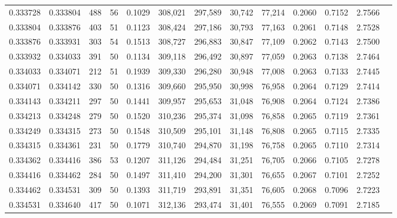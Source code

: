 \begin{tabular}{rrrrrrrrrrrrr}
0.333728 & 0.333804 &   488 &  56 &                                     0.1029 & 308,021 & 297,589 &  30,742 &  77,214 & 0.2060 & 0.7152 & 2.7566 \\
0.333804 & 0.333876 &   403 &  51 &                                     0.1123 & 308,424 & 297,186 &  30,793 &  77,163 & 0.2061 & 0.7148 & 2.7528 \\
0.333876 & 0.333931 &   303 &  54 &                                     0.1513 & 308,727 & 296,883 &  30,847 &  77,109 & 0.2062 & 0.7143 & 2.7500 \\
0.333932 & 0.334033 &   391 &  50 &                                     0.1134 & 309,118 & 296,492 &  30,897 &  77,059 & 0.2063 & 0.7138 & 2.7464 \\
0.334033 & 0.334071 &   212 &  51 &                                     0.1939 & 309,330 & 296,280 &  30,948 &  77,008 & 0.2063 & 0.7133 & 2.7445 \\
0.334071 & 0.334142 &   330 &  50 &                                     0.1316 & 309,660 & 295,950 &  30,998 &  76,958 & 0.2064 & 0.7129 & 2.7414 \\
0.334143 & 0.334211 &   297 &  50 &                                     0.1441 & 309,957 & 295,653 &  31,048 &  76,908 & 0.2064 & 0.7124 & 2.7386 \\
0.334213 & 0.334248 &   279 &  50 &                                     0.1520 & 310,236 & 295,374 &  31,098 &  76,858 & 0.2065 & 0.7119 & 2.7361 \\
0.334249 & 0.334315 &   273 &  50 &                                     0.1548 & 310,509 & 295,101 &  31,148 &  76,808 & 0.2065 & 0.7115 & 2.7335 \\
0.334315 & 0.334361 &   231 &  50 &                                     0.1779 & 310,740 & 294,870 &  31,198 &  76,758 & 0.2065 & 0.7110 & 2.7314 \\
0.334362 & 0.334416 &   386 &  53 &                                     0.1207 & 311,126 & 294,484 &  31,251 &  76,705 & 0.2066 & 0.7105 & 2.7278 \\
0.334416 & 0.334462 &   284 &  50 &                                     0.1497 & 311,410 & 294,200 &  31,301 &  76,655 & 0.2067 & 0.7101 & 2.7252 \\
0.334462 & 0.334531 &   309 &  50 &                                     0.1393 & 311,719 & 293,891 &  31,351 &  76,605 & 0.2068 & 0.7096 & 2.7223 \\
0.334531 & 0.334640 &   417 &  50 &                                     0.1071 & 312,136 & 293,474 &  31,401 &  76,555 & 0.2069 & 0.7091 & 2.7185 \\

\end{tabular}
